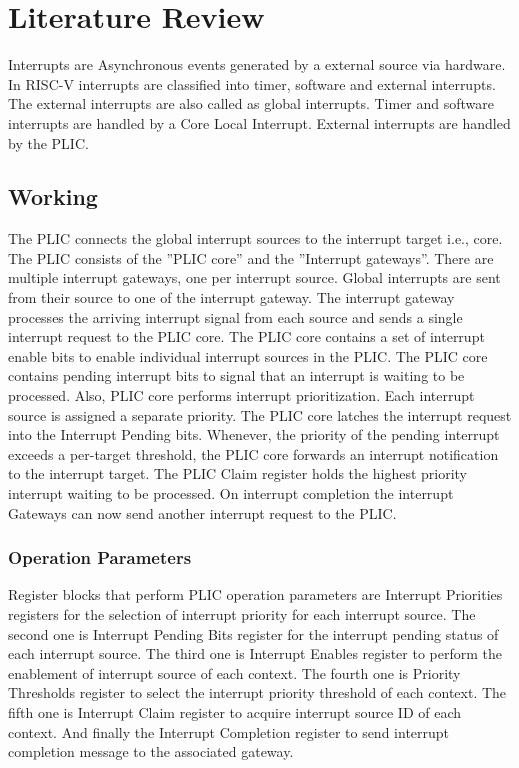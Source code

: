 
\chapter{Literature Review}
\label{Chapter3}

Interrupts are Asynchronous events generated by a external source via hardware. In RISC-V interrupts are classified into timer,
software and external interrupts. The external interrupts are also called as global interrupts. Timer and software interrupts are handled by a Core Local Interrupt. External interrupts are handled by the PLIC.

\section{Working}

The PLIC connects the global interrupt sources to the interrupt target i.e., core. The PLIC consists of the ”PLIC core” and the ”Interrupt gateways”. There are multiple interrupt gateways, one per interrupt source. Global interrupts are sent from their source to one of the interrupt gateway. The interrupt gateway processes the arriving interrupt signal from each source and sends a single interrupt request to the PLIC core. The PLIC core contains a set of interrupt enable bits to enable individual interrupt sources in the PLIC. The PLIC core contains pending interrupt bits to signal that an interrupt is waiting to be processed. Also, PLIC core performs interrupt prioritization. Each interrupt source is assigned a separate priority. The PLIC core latches the interrupt request into the Interrupt Pending bits. Whenever, the priority of the pending interrupt exceeds a per-target threshold, the PLIC core forwards an interrupt notification to the interrupt target. The PLIC Claim register holds the highest priority interrupt waiting to be processed. On interrupt completion the interrupt Gateways can now send another interrupt request to the PLIC.

\subsection{Operation Parameters}

Register blocks that perform PLIC operation parameters are Interrupt Priorities registers for the selection of interrupt priority for each interrupt source. The second one is Interrupt Pending Bits register for the interrupt pending status of each interrupt source. The third one is  Interrupt Enables register to perform the enablement of interrupt source of each context. The fourth one is  Priority Thresholds register to select the interrupt priority threshold of each context. The fifth one is Interrupt Claim register to acquire interrupt source ID of each context. And finally the Interrupt Completion register to send interrupt completion message to the associated gateway.

